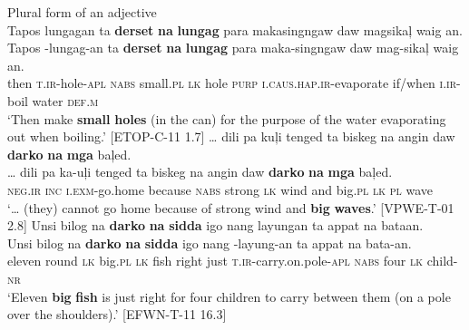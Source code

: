 \ea
\label{bkm:Ref447720514}
Plural form of an adjective \\
Tapos  lungagan  ta  \textbf{derset}  \textbf{na}  \textbf{lungag}  para  makasingngaw daw  magsikaļ  waig  an. \\\smallskip
 \gll Tapos  \emptyset{}-lungag-an  ta  \textbf{derset}  \textbf{na}  \textbf{lungag}  para  maka-singngaw daw  mag-sikaļ  waig  an. \\
then  \textsc{t.ir}-hole-\textsc{apl}  \textsc{nabs} small.\textsc{pl}  \textsc{lk} hole  \textsc{purp}  \textsc{i.caus.hap.ir}-evaporate if/when  \textsc{i.ir}-boil  water  \textsc{def.m} \\
\glt `Then make \textbf{small} \textbf{holes} (in the can) for the purpose of the water evaporating out when boiling.’ [ETOP-C-11 1.7]
\z
\ea
\label{bkm:Ref447720545}
 … dili  pa  kuļi  tenged  ta  biskeg  na  angin  daw \textbf{darko}  \textbf{na}  \textbf{mga}  baļed. \\\smallskip
 \gll … dili  pa  ka-uļi  tenged  ta  biskeg  na  angin  daw \textbf{darko}  \textbf{na}  \textbf{mga}  baļed. \\
{} \textsc{neg.ir}  \textsc{inc}  \textsc{i.exm}-go.home  because  \textsc{nabs}  strong  \textsc{lk}  wind  and big.\textsc{pl}  \textsc{lk}  \textsc{pl}  wave \\
\glt `… (they) cannot go home because of strong wind and \textbf{big} \textbf{waves}.’ [VPWE-T-01 2.8]
\z
\ea
\label{bkm:Ref447720547}
Unsi  bilog  na  \textbf{darko}  \textbf{na}  \textbf{sidda}  igo  nang  layungan ta  appat  na  bataan. \\\smallskip
 \gll Unsi  bilog  na  \textbf{darko}  \textbf{na}  \textbf{sidda}  igo  nang  \emptyset{}-layung-an ta  appat  na  bata-an. \\
eleven  round  \textsc{lk}  big.\textsc{pl}  \textsc{lk}  fish  right  just  \textsc{t.ir}-carry.on.pole-\textsc{apl} \textsc{nabs}  four  \textsc{lk}  child-\textsc{nr} \\
\glt `Eleven \textbf{big} \textbf{fish} is just right for four children to carry between them (on a pole over the shoulders).’ [EFWN-T-11 16.3]
\z

